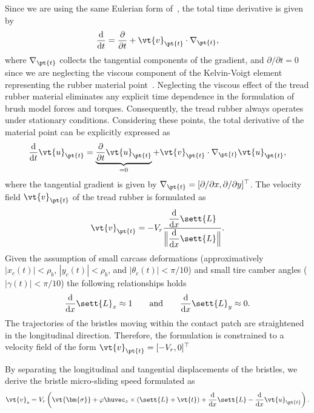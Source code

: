 Since we are using the same Eulerian form of~\cite{romano2022analytical}, the total time derivative is given by
%
\begin{equation}
  \dfrac{\mathrm{d}}{\mathrm{d}t} =  \dfrac{\partial}{\partial t} + \vt{v}_{\pt{t}} \cdot\nabla_{\pt{t}},
\end{equation}
%
where $\nabla_{\pt{t}}$ collects the tangential components of the gradient, and $\partial/\partial t = 0$ since we are neglecting the viscous component of the Kelvin-Voigt element representing the rubber material point~\cite{meyers2008mechanical}. Neglecting the viscous effect of the tread rubber material eliminates any explicit time dependence in the formulation of brush model forces and torques. Consequently, the tread rubber always operates under stationary conditions. Considering these points, the total derivative of the material point can be explicitly expressed as
%
\begin{equation}
  \dfrac{\mathrm{d}}{\mathrm{d}t}\vt{u}_{\pt{t}} = \underbrace{\dfrac{\partial}{\partial t}\vt{u}_{\pt{t}}}_{=0} + \vt{v}_{\pt{t}}\cdot\nabla_{\pt{t}}\vt{u}_{\pt{t}},
\end{equation}
%
where the tangential gradient is given by $\nabla_{\pt{t}} = [\partial/\partial x, \partial/\partial y]^\top$. The velocity field $\vt{v}_{\pt{t}}$ of the tread rubber is formulated as
%
\begin{equation}
  \vt{v}_{\pt{t}} = -V_r \dfrac{\dfrac{\mathrm{d}}{\mathrm{d}x} \sett{L}}{\Big\|\dfrac{\mathrm{d}}{\mathrm{d}x} \sett{L}\Big\|}.
\end{equation}
%
Given the assumption of small carcass deformations (approximatively $|x_c(t)| < \rho_b$, $|y_c(t)| < \rho_b$, and $|\theta_c(t)| < \pi/10$) and small tire camber angles ($|\gamma(t)| < \pi/10$) the following relationships holds~\cite{romano2022advanced}
%
\begin{equation}
  \dfrac{\mathrm{d}}{\mathrm{d}x} \sett{L}_x \approx 1 \qquad \text{and} \qquad \dfrac{\mathrm{d}}{\mathrm{d}x} \sett{L}_y \approx 0.
  \label{app3:eq:approx}
\end{equation}
%
The trajectories of the bristles moving within the contact patch are straightened in the longitudinal direction. Therefore, the formulation is constrained to a velocity field of the form $\vt{v}_{\pt{t}} = [-V_r, 0]^\top$

By separating the longitudinal and tangential displacements of the bristles, we derive the bristle micro-sliding speed formulated as
%
\begin{equation}
  \vt{v}_s = V_r\left( \vt{\bm{\sigma}} + \varphi\huvec_z \times \left(\sett{L} + \vt{t}\right) + \dfrac{\mathrm{d}}{\mathrm{d}x}\sett{L} - \dfrac{\mathrm{d}}{\mathrm{d}x}\vt{u}_{\pt{t}} \right).
  \label{app3:eq:v_s_int}
\end{equation}

